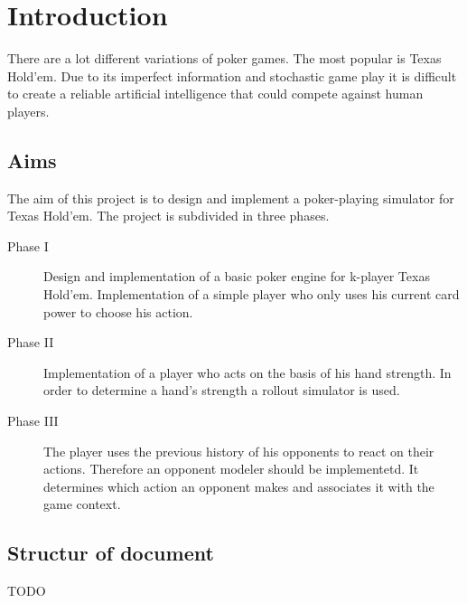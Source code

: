 \chapter{Introduction}
There are a lot different variations of poker games. The most popular is Texas Hold'em. Due to its imperfect information and stochastic game play it is difficult to create a reliable artificial intelligence that could compete against human players. 

\section{Aims}
The aim of this project is to design and implement a poker-playing simulator for Texas Hold'em. The project is subdivided in three phases.
\begin{description}
	\item[Phase I] Design and implementation of a basic poker engine for k-player Texas Hold'em. Implementation of a simple player who only uses his current card power to choose his action. 
	\item[Phase II] Implementation of a player who acts on the basis of his hand strength. In order to determine a hand's strength a rollout simulator is used.
	\item[Phase III] The player uses the previous history of his opponents to react on their actions. Therefore an opponent modeler should be implementetd.  It determines which action an opponent makes and associates it with the game context.
\end{description}

\section{Structur of document}
TODO


